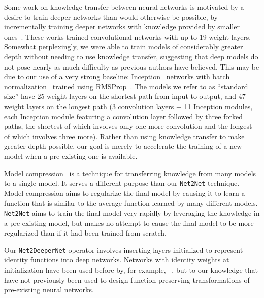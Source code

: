 \documentclass{article} %
\begin{document}
Some work on knowledge transfer between neural networks is motivated
by a desire to train deeper networks than would otherwise be possible,
by incrementally training deeper networks with knowledge provided
by smaller ones~\citep{Romero-et-al-TR2014,Simonyan2015}.
These works trained convolutional networks with up to 19 weight layers.
Somewhat perplexingly, we were able to train models of considerably
greater depth
without needing to use knowledge transfer, suggesting that deep models
do not pose nearly as much difficulty as previous authors have believed.
This may be due to our use of a very strong baseline:
Inception~\citep{Szegedy-et-al-arxiv2014}
networks with batch normalization~\citep{Ioffe+Szegedy-2015}
trained using RMSProp~\citep{tieleman2012lecture}.
The models we refer to as ``standard size'' have 25 weight layers on
the shortest path from input to output, and 47 weight layers on the
longest path (3 convolution layers + 11 Inception modules, each
Inception module featuring a convolution layer followed by three
forked paths, the shortest of which involves only one more convolution
and the longest of which involves three more).
Rather than using knowledge transfer to make greater depth possible,
our goal is merely to accelerate the training of a new model when
a pre-existing one is available.

Model compression~\citep{bucilua2006model,hinton2015distilling} is a technique
for transferring knowledge from many models to a single model. It serves a
different purpose than our {\tt Net2Net} technique. Model compression aims to
regularize the final model by causing it to learn a function that is similar
to the average function learned by many different models. {\tt Net2Net} aims
to train the final model very rapidly by leveraging the knowledge in a
pre-existing model, but makes no attempt to cause the final model to be more
regularized than if it had been trained from scratch.

Our {\tt Net2DeeperNet} operator involves inserting layers initialized
to represent identity functions into
deep networks. Networks with identity weights at initialization have been
used before by, for example, ~\citet{Socher13parsingwith}, but to our knowledge
that have not previously been used to design function-preserving transformations
of pre-existing neural networks.
\end{document}
